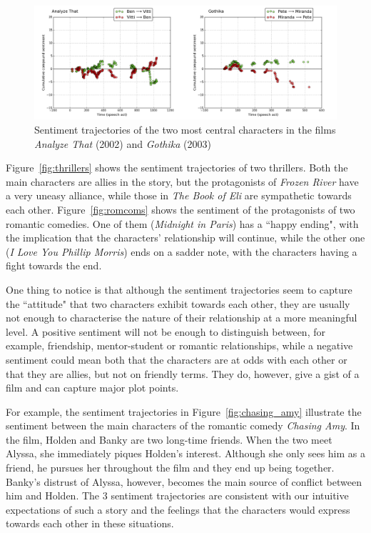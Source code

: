 \documentclass[bsc,frontabs,singlespacing,parskip, twoside]{infthesis}
\begin{document}
\begin{figure}[h!]
\begin{adjustwidth}{-0.5in}{-0.5in}
	\centering
	\includegraphics[scale=0.43]{figures/y_contradictions}
	\caption{Sentiment trajectories of the two most central characters in the films \textit{Analyze That} (2002) and \textit{Gothika} (2003)}
	\label{fig:contradictions}
\end{adjustwidth}
\end{figure}


Figure~\ref{fig:thrillers} shows the sentiment trajectories of two thrillers. Both the main characters are allies in the story, but the protagonists of \textit{Frozen River} have a very uneasy alliance, while those in \textit{The Book of Eli} are sympathetic towards each other. Figure~\ref{fig:romcoms} shows the sentiment of the protagonists of two romantic  comedies. One of them (\textit{Midnight in Paris}) has a ``happy ending", with the implication that the characters' relationship will continue, while the other one (\textit{I Love You Phillip Morris}) ends on a sadder note, with the characters having a fight towards the end.

One thing to notice is that although the sentiment trajectories seem to capture the ``attitude" that two characters exhibit towards each other, they are usually not enough to characterise the nature of their relationship at a more meaningful level. A positive sentiment will not be enough to distinguish between, for example, friendship, mentor-student or romantic relationships, while a negative sentiment could mean both that the characters are at odds with each other or that they are allies, but not on friendly terms. They do, however, give a gist of a film and can capture major plot points. 

For example, the sentiment trajectories in Figure~\ref{fig:chasing_amy} illustrate the sentiment between the main characters of the romantic comedy \textit{Chasing Amy}. In the film, Holden and Banky are two long-time friends. When the two meet Alyssa, she immediately piques Holden's interest. Although she only sees him as a friend, he pursues her throughout the film and they end up being together. Banky's distrust of Alyssa, however, becomes the main source of conflict between him and Holden. The 3 sentiment trajectories are consistent with our intuitive expectations of such a story and the feelings that the characters would express towards each other in these situations.
\end{document}
